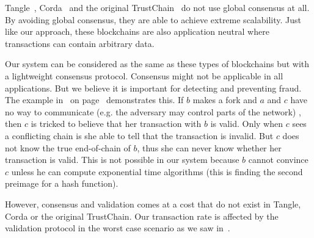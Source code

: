 Tangle~\cite{tangle}, Corda~\cite{corda} and the original TrustChain~\cite{trustchain} do not use global consensus at all.
By avoiding global consensus, they are able to achieve extreme scalability.
Just like our approach, these blockchains are also application neutral where transactions can contain arbitrary data.

Our system can be considered as the same as these types of blockchains but with a lightweight consensus protocol.
Consensus might not be applicable in all applications.
But we believe it is important for detecting and preventing fraud.
The example in~ on page~\pageref{fig:trustchain-bad} demonstrates this.
If $b$ makes a fork and $a$ and $c$ have no way to communicate (e.g. the adversary may control parts of the network) ,
then $c$ is tricked to believe that her transaction with $b$ is valid.
Only when $c$ sees a conflicting chain is she able to tell that the transaction is invalid.
But $c$ does not know the true end-of-chain of $b$, thus she can never know whether her transaction is valid.
This is not possible in our system because $b$ cannot convince $c$ unless he can compute exponential time algorithms
(this is finding the second preimage for a hash function).

However, consensus and validation comes at a cost that do not exist in Tangle, Corda or the original TrustChain.
Our transaction rate is affected by the validation protocol in the worst case scenario as we saw in~.

